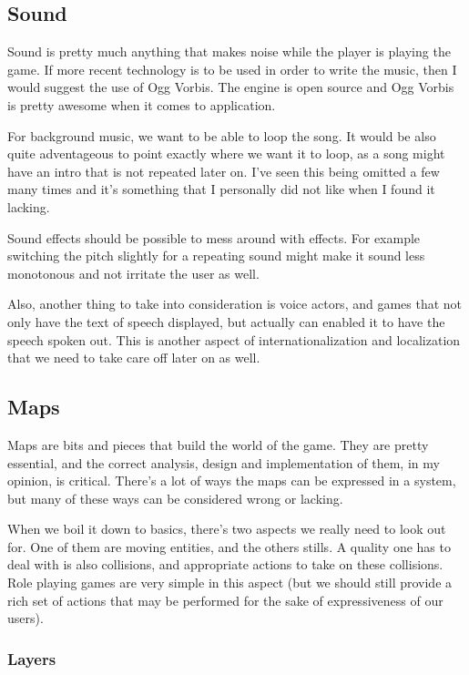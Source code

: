 \subsection{Sound}

Sound is pretty much anything that makes noise while the player is playing the
game. If more recent technology is to be used in order to write the music, then
I would suggest the use of Ogg Vorbis. The engine is open source and Ogg Vorbis
is pretty awesome when it comes to application.

For background music, we want to be able to loop the song. It would be also 
quite adventageous to point exactly where we want it to loop, as a song might
have an intro that is not repeated later on. I've seen this being omitted a few
many times and it's something that I personally did not like when I found it 
lacking.

Sound effects should be possible to mess around with effects. For example 
switching the pitch slightly for a repeating sound might make it sound less 
monotonous and not irritate the user as well. 

Also, another thing to take into consideration is voice actors, and games that
not only have the text of speech displayed, but actually can enabled it to have
the speech spoken out. This is another aspect of internationalization and 
localization that we need to take care off later on as well.

\subsection{Maps}

Maps are bits and pieces that build the world of the game. They are pretty
essential, and the correct analysis, design and implementation of them, in my
opinion, is critical. There's a lot of ways the maps can be expressed in a 
system, but many of these ways can be considered wrong or lacking.

When we boil it down to basics, there's two aspects we really need to look out
for. One of them are moving entities, and the others stills. A quality one has 
to deal with is also collisions, and appropriate actions to take on these 
collisions. Role playing games are very simple in this aspect (but we should
still provide a rich set of actions that may be performed for the sake of 
expressiveness of our users).

\subsubsection{Layers} 

